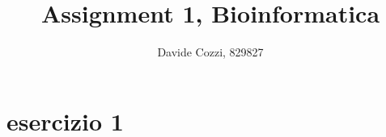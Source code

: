 \documentclass[a4paper,12pt, oneside]{book}
\title{Assignment 1, Bioinformatica}
\author{Davide Cozzi, 829827}
\date{}
\begin{document}
\maketitle

\newtheorem{teorema}{Teorema}
\newtheorem{definizione}{Definizione}
\newtheorem{esempio}{Esempio}
\newtheorem{corollario}{Corollario}
\newtheorem{lemma}{Lemma}
\newtheorem{osservazione}{Osservazione}
\newtheorem{nota}{Nota}
\newtheorem{esercizio}{Esercizio}

\renewcommand{\chaptermark}[1]{%
  \markboth{\chaptername
    \ \thechapter.\ #1}{}}
\renewcommand{\sectionmark}[1]{\markright{\thesection.\ #1}}
\tableofcontents
\chapter{esercizio 1}
\end{document}
